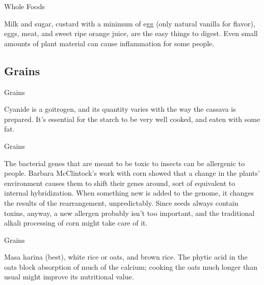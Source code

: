 \documentclass[11pt,oneside,openany,extrafontsizes]{memoir}
\begin{document}
\begin{standalonequote}{Whole Foods}

    \begin{answer}
      Milk and sugar, custard with a minimum of egg (only natural vanilla for flavor), eggs, meat, and sweet ripe orange juice, are the easy things to digest. Even small amounts of plant material can cause inflammation for some people.
    \end{answer}
\end{standalonequote}

\subsection{Grains}

\begin{standalonequote}{Grains}

    \begin{answer}
        Cyanide is a goitrogen, and its quantity varies with the way the cassava is prepared. It's essential for the starch to be very well cooked, and eaten with some fat.
    \end{answer}
\end{standalonequote}

\begin{standalonequote}{Grains}

    \begin{answer}
        The bacterial genes that are meant to be toxic to insects can be allergenic to people. Barbara McClintock's work with corn showed that a change in the plants' environment causes them to shift their genes around, sort of equivalent to internal hybridization. When something new is added to the genome, it changes the results of the rearrangement, unpredictably. Since seeds always contain toxins, anyway, a new allergen probably isn't too important, and the traditional alkali processing of corn might take care of it.
    \end{answer}
\end{standalonequote}

\begin{standalonequote}{Grains}

    \begin{answer}
        Masa harina (best), white rice or oats, and brown rice. The phytic acid in the oats block absorption of much of the calcium; cooking the oats much longer than usual might improve its nutritional value.
    \end{answer}
\end{standalonequote}
\end{document}
